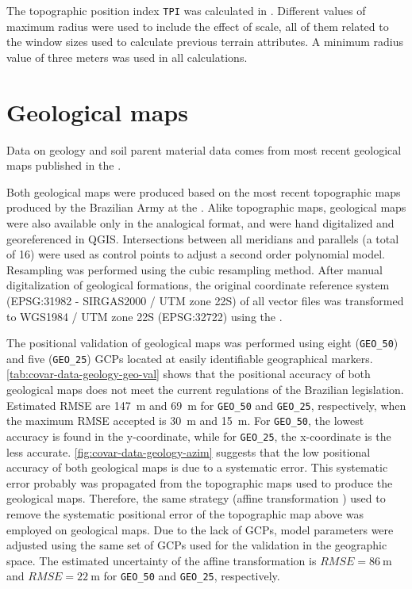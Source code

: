 The topographic position index \texttt{TPI} was calculated in . Different 
values of maximum radius were used to include the effect of scale, all of them related to the window 
sizes used to calculate previous terrain attributes. A minimum radius value of three meters was used 
in all calculations.

\tocless\section{Geological maps}
\label{sec:covar-data-geo-maps}

Data on geology and soil parent material data comes from most recent geological maps published in 
the  \cite{MacielFilho1990,GasparettoEtAl1988}.

Both geological maps were produced based on the most recent topographic maps produced by the 
Brazilian Army at the . Alike topographic maps, geological maps were also 
available only in the analogical format, and were hand digitalized and georeferenced in QGIS. 
Intersections between all meridians and parallels (a total of 16) were used as control points to 
adjust a second order polynomial model. Resampling was performed using the cubic resampling method. 
After manual digitalization of geological formations, the original coordinate reference system 
(EPSG:31982 - SIRGAS2000 / UTM zone 22S) of all vector files was transformed to WGS1984 / UTM zone 
22S (EPSG:32722) using the  \cite{BivandEtAl2013a}.

The positional validation of geological maps was performed using eight (\texttt{GEO\_50}) and five 
(\texttt{GEO\_25}) GCPs located at easily identifiable geographical markers. 
\autoref{tab:covar-data-geology-geo-val} shows that the positional accuracy of both geological maps 
does not meet the current regulations of the Brazilian legislation. Estimated RMSE are \SI{147}{\m} 
and \SI{69}{\m} for \texttt{GEO\_50} and \texttt{GEO\_25}, respectively, when the maximum RMSE 
accepted is \SI{30}{\m} and \SI{15}{\m}. For \texttt{GEO\_50}, the lowest accuracy is found in the 
y-coordinate, while for \texttt{GEO\_25}, the x-coordinate is the less accurate. 
\autoref{fig:covar-data-geology-azim} suggests that the low positional accuracy  of both geological 
maps is due to a systematic error. This systematic error probably was propagated from the 
topographic maps used to produce the geological maps. Therefore, the same strategy (affine 
transformation ) used to remove the systematic positional error of the topographic map above was 
employed on geological maps. Due to the lack of GCPs, model parameters were adjusted using the same 
set of GCPs used for the validation in the geographic space. The estimated uncertainty of the 
affine transformation is $RMSE = \SI{86}{\m}$ and $RMSE = \SI{22}{\m}$ for 
\texttt{GEO\_50} and \texttt{GEO\_25}, respectively.

